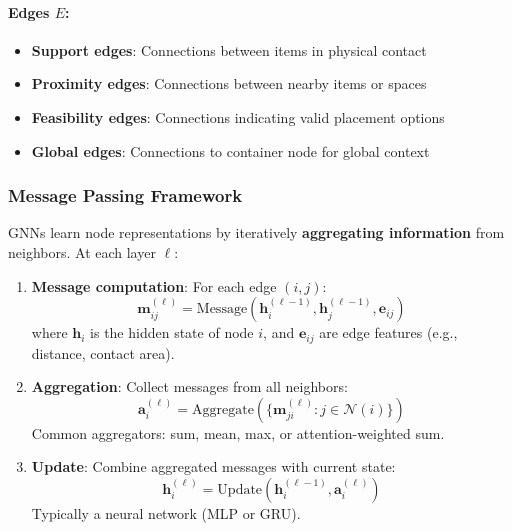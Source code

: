 \paragraph{Edges $E$:}
\begin{itemize}
\item \textbf{Support edges}: Connections between items in physical contact
\item \textbf{Proximity edges}: Connections between nearby items or spaces
\item \textbf{Feasibility edges}: Connections indicating valid placement options
\item \textbf{Global edges}: Connections to container node for global context
\end{itemize}

\subsubsection{Message Passing Framework}

GNNs learn node representations by iteratively \textbf{aggregating information} from neighbors. At each layer $\ell$:

\begin{enumerate}
\item \textbf{Message computation}: For each edge $(i, j)$:
   \begin{equation}
   \mathbf{m}_{ij}^{(\ell)} = \text{Message}(\mathbf{h}_i^{(\ell-1)}, \mathbf{h}_j^{(\ell-1)}, \mathbf{e}_{ij})
   \end{equation}
   where $\mathbf{h}_i$ is the hidden state of node $i$, and $\mathbf{e}_{ij}$ are edge features (e.g., distance, contact area).

\item \textbf{Aggregation}: Collect messages from all neighbors:
   \begin{equation}
   \mathbf{a}_i^{(\ell)} = \text{Aggregate}\left(\{\mathbf{m}_{ji}^{(\ell)} : j \in \mathcal{N}(i)\}\right)
   \end{equation}
   Common aggregators: sum, mean, max, or attention-weighted sum.

\item \textbf{Update}: Combine aggregated messages with current state:
   \begin{equation}
   \mathbf{h}_i^{(\ell)} = \text{Update}(\mathbf{h}_i^{(\ell-1)}, \mathbf{a}_i^{(\ell)})
   \end{equation}
   Typically a neural network (MLP or GRU).
\end{enumerate}

